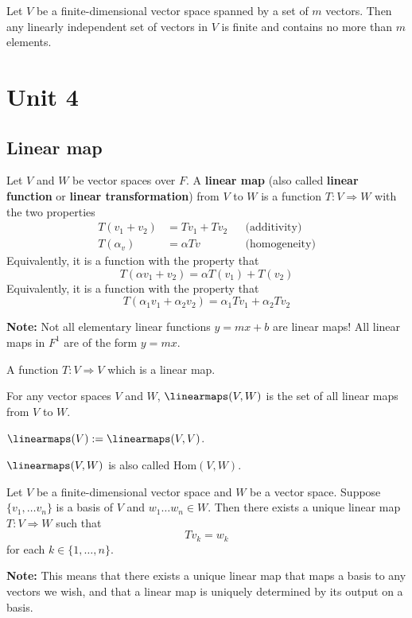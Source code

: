 \begin{theorem}
  Let $V$ be a finite-dimensional vector space spanned by a set of $m$ vectors. Then any linearly independent set of vectors in $V$ is finite and contains no more than $m$ elements.
\end{theorem}

\section{Unit 4}

\subsection{Linear map}

\begin{definition}
  Let $V$ and $W$ be vector spaces over $F$. A \textbf{linear map} (also called \textbf{linear function} or \textbf{linear transformation}) from $V$ to $W$ is a function $T : V \Rightarrow W$ with the two properties
  \begin{align*}
    T(v_1 + v_2) &= Tv_1 + Tv_2 && \text{(additivity)} \\
    T(\alpha_v) &= \alpha Tv && \text{(homogeneity)}
  \end{align*}
  Equivalently, it is a function with the property that 
  \[
    T(\alpha v_1 + v_2) = \alpha T(v_1) + T(v_2)
  \]  
  Equivalently, it is a function with the property that
  \[
    T(\alpha_1 v_1 + \alpha_2 v_2) = \alpha_1 T v_1 + \alpha_2 T v_2
  \]
\end{definition}

\textbf{Note:} Not all elementary linear functions $y = mx + b$ are linear maps! All linear maps in $F^1$ are of the form $y = mx$.

\begin{definition} A function $T : V \Rightarrow V$ which is a linear map.
\end{definition}

\begin{definition}[$\linearmaps$]
  For any vector spaces $V$ and $W$, $\linearmaps(V,W)$ is the set of all linear maps from $V$ to $W$.

  $\linearmaps(V) := \linearmaps(V,V)$.

  $\linearmaps(V,W)$ is also called $\text{Hom}(V,W)$.
\end{definition}

\begin{namedlemma}
  Let $V$ be a finite-dimensional vector space and $W$ be a vector space. Suppose $\{ v_1, \ldots v_n \}$ is a basis of $V$ and $w_1 \ldots w_n \in W$. Then there exists a unique linear map $T : V \Rightarrow W$ such that
  \[
    Tv_k = w_k
  \]
  for each $k \in \{1, \ldots, n\}$.

  \textbf{Note:} This means that there exists a unique linear map that maps a basis to any vectors we wish, and that a linear map is uniquely determined by its output on a basis.
\end{namedlemma}

